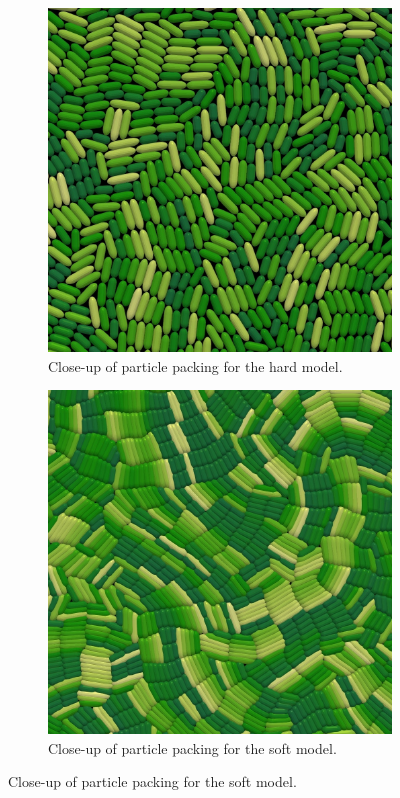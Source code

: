 \documentclass[conference]{IEEEtran}
\begin{document}
\begin{figure}[H]
    \centering
    \begin{subfigure}[b]{0.49\columnwidth}
        \centering
        \includegraphics[width=\linewidth]{figures/comparison_plots/density_hard.jpeg}
        \caption{Close-up of particle packing for the hard model.}
        \label{fig:packing_hard}
    \end{subfigure}
    \begin{subfigure}[b]{0.49\columnwidth}
        \centering
        \includegraphics[width=\linewidth]{figures/comparison_plots/density_soft.jpeg}
        \caption{Close-up of particle packing for the soft model.}
        \label{fig:packing_soft}
    \end{subfigure}


\end{figure}
\end{document}
